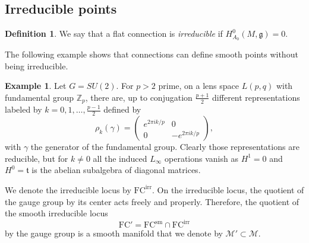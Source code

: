 \documentclass[11pt,a4paper]{amsart}
\theoremstyle{plain} %
\newtheorem{prop}[thm]{Proposition}
\theoremstyle{definition}
\newtheorem{defn}[thm]{Definition}
\newtheorem{expl}[thm]{Example}
\theoremstyle{remark}
\newcommand{\C}{\mathbb{C}}
\newcommand{\Z}{\mathbb{Z}}
\newcommand{\g}{\mathfrak{g}}
\newcommand{\mr}{\mathrm}
\newcommand{\M}{\mathcal{M}}
\newcommand{\FC}{\mathrm{FC}}
\begin{document}
{


\subsection{Irreducible points}
\begin{defn}
    We say that a flat connection is \emph{irreducible} if  $H^0_{A_0}(M,\g) = 0$.
\end{defn}

The following example shows that connections can define smooth points without being irreducible.
\begin{expl}
    Let $G = SU(2)$. For $p > 2$ prime, on a lens space $L(p,q)$ with fundamental group $\Z_p$, there are, up to conjugation $\frac{p+1}{2}$ different representations labeled by $k = 0,1,\ldots, \frac{p-1}{2}$ defined by 
    $$\rho_k(\gamma) = \begin{pmatrix} e^{2\pi i k/p} & 0 \\ 0 & -e^{2\pi i k/p} \end{pmatrix},$$ 
    with $\gamma$ the generator of the fundamental group.
    Clearly those representations are reducible, but for $k\neq 0$ all the induced $L_\infty$ operations vanish as $H^1 = 0$ and $H^0 = \mathfrak{t}$ is the abelian subalgebra of diagonal matrices. 
\end{expl}
We denote the irreducible locus by $\FC^\mr{irr}$. On the irreducible locus, the quotient of the gauge group by its center acts freely and properly. Therefore, the quotient of the smooth irreducible locus 
\begin{equation}
    \FC' = \FC^\mr{sm} \cap \FC^\mr{irr}
\end{equation}
by the gauge group is a smooth manifold that we denote by $\M' \subset \M$.




}
\end{document}
